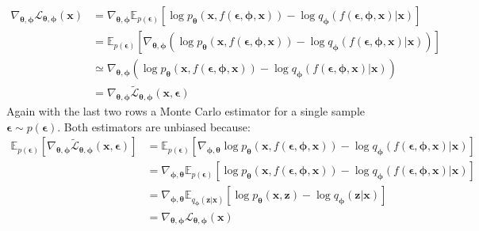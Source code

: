 \documentclass[12pt]{report}
\theoremstyle{definition}
\begin{document}
\begin{equation}
\begin{split}
\nabla_{\pmb{\theta}, \pmb{\phi}}\mathcal{L}_{\pmb{\theta}, \pmb{\phi}}(\mathbf{x})
& = \nabla_{\pmb{\theta}, \pmb{\phi}} \mathbb{E}_{p(\pmb{\epsilon})}\left[ \log p_{\pmb{\theta}}(\mathbf{x}, f(\pmb{\epsilon}, \pmb{\phi}, \mathbf{x})) - \log q_{\pmb{\phi}}(f(\pmb{\epsilon}, \pmb{\phi}, \mathbf{x})|\mathbf{x}) \right]	\\
& = \mathbb{E}_{p(\pmb{\epsilon})}\left[ \nabla_{\pmb{\theta}, \pmb{\phi}}(\log p_{\pmb{\theta}}(\mathbf{x}, f(\pmb{\epsilon}, \pmb{\phi}, \mathbf{x})) - \log q_{\pmb{\phi}}(f(\pmb{\epsilon}, \pmb{\phi}, \mathbf{x})|\mathbf{x})) \right]	\\
& \simeq \nabla_{\pmb{\theta}, \pmb{\phi}}(\log p_{\pmb{\theta}}(\mathbf{x}, f(\pmb{\epsilon}, \pmb{\phi}, \mathbf{x})) - \log q_{\pmb{\phi}}(f(\pmb{\epsilon}, \pmb{\phi}, \mathbf{x})|\mathbf{x})) \\
& = \nabla_{\pmb{\theta}, \pmb{\phi}}\tilde{\mathcal{L}}_{\pmb{\theta}, \pmb{\phi}}(\mathbf{x}, \pmb{\epsilon})
\end{split}
\end{equation}
Again with the last two rows a Monte Carlo estimator for a single sample $\pmb{\epsilon} \sim p(\pmb{\epsilon})$. Both estimators are unbiased because:
\begin{equation}
\begin{split}
\mathbb{E}_{p(\pmb{\epsilon})}\left[ \nabla_{\pmb{\theta}, \pmb{\phi}}\tilde{\mathcal{L}}_{\pmb{\theta}, \pmb{\phi}}(\mathbf{x}, \pmb{\epsilon}) \right]
& = \mathbb{E}_{p(\pmb{\epsilon})}\left[ \nabla_{\pmb{\phi}, \pmb{\theta}} \log p_{\pmb{\theta}}(\mathbf{x}, f(\pmb{\epsilon}, \pmb{\phi}, \mathbf{x})) - \log q_{\pmb{\phi}}(f(\pmb{\epsilon}, \pmb{\phi}, \mathbf{x})|\mathbf{x}) \right] \\
& = \nabla_{\pmb{\phi}, \pmb{\theta}} \mathbb{E}_{p(\pmb{\epsilon})}\left[  \log p_{\pmb{\theta}}(\mathbf{x}, f(\pmb{\epsilon}, \pmb{\phi}, \mathbf{x})) - \log q_{\pmb{\phi}}(f(\pmb{\epsilon}, \pmb{\phi}, \mathbf{x})|\mathbf{x}) \right] \\
& = \nabla_{\pmb{\phi}, \pmb{\theta}} \mathbb{E}_{q_{\pmb{\phi}}(\mathbf{z}|\mathbf{x})}\left[  \log p_{\pmb{\theta}}(\mathbf{x}, \mathbf{z}) - \log q_{\pmb{\phi}}(\mathbf{z}|\mathbf{x}) \right] \\
& = \nabla_{\pmb{\theta}, \pmb{\phi}}\mathcal{L}_{\pmb{\theta}, \pmb{\phi}}(\mathbf{x})
\end{split}
\end{equation}
\end{document}
